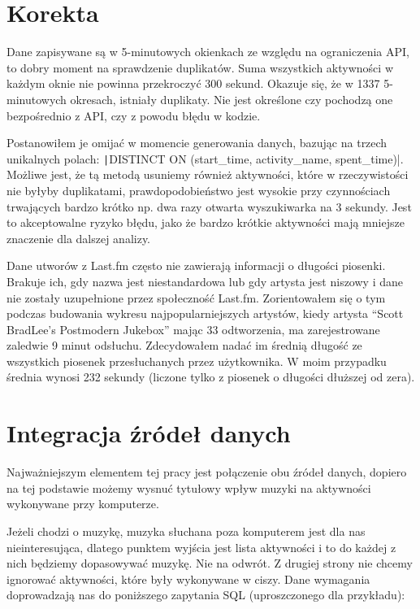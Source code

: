 \documentclass[openright]{xmgr}
\begin{document}
    \section{Korekta}

        Dane zapisywane są w 5-minutowych okienkach ze względu na ograniczenia API, to dobry moment na sprawdzenie duplikatów.
        Suma wszystkich aktywności w każdym oknie nie powinna przekroczyć 300 sekund.
        Okazuje się, że w 1337 5-minutowych okresach, istniały duplikaty.
        Nie jest określone czy pochodzą one bezpośrednio z API, czy z powodu błędu w kodzie.

        Postanowiłem je omijać w momencie generowania danych, bazując na trzech unikalnych polach:
        \texttt|DISTINCT ON (start_time, activity_name, spent_time)|.
        Możliwe jest, że tą metodą usuniemy również aktywności, które w rzeczywistości nie byłyby duplikatami,
        prawdopodobieństwo jest wysokie przy czynnościach trwających bardzo krótko np. dwa razy otwarta wyszukiwarka na 3 sekundy.
        Jest to akceptowalne ryzyko błędu, jako że bardzo krótkie aktywności mają mniejsze znaczenie dla dalszej analizy.

        Dane utworów z Last.fm często nie zawierają informacji o długości piosenki.
        Brakuje ich, gdy nazwa jest niestandardowa lub gdy artysta jest niszowy i dane nie zostały uzupełnione przez społeczność Last.fm.
        Zorientowałem się o tym podczas budowania wykresu najpopularniejszych artystów,
        kiedy artysta ``Scott BradLee's Postmodern Jukebox'' mając 33 odtworzenia, ma zarejestrowane zaledwie 9 minut odsłuchu.
        Zdecydowałem nadać im średnią długość ze wszystkich piosenek przesłuchanych przez użytkownika.
        W moim przypadku średnia wynosi 232 sekundy (liczone tylko z piosenek o długości dłuższej od zera).

    \section{Integracja źródeł danych}

        Najważniejszym elementem tej pracy jest połączenie obu źródeł danych,
        dopiero na tej podstawie możemy wysnuć tytułowy wpływ muzyki na aktywności wykonywane przy komputerze.

        Jeżeli chodzi o muzykę, muzyka słuchana poza komputerem jest dla nas nieinteresująca,
        dlatego punktem wyjścia jest lista aktywności i to do każdej z nich będziemy dopasowywać muzykę. Nie na odwrót.
        Z drugiej strony nie chcemy ignorować aktywności, które były wykonywane w ciszy.
        Dane wymagania doprowadzają nas do poniższego zapytania SQL (uproszczonego dla przykładu):
\end{document}

